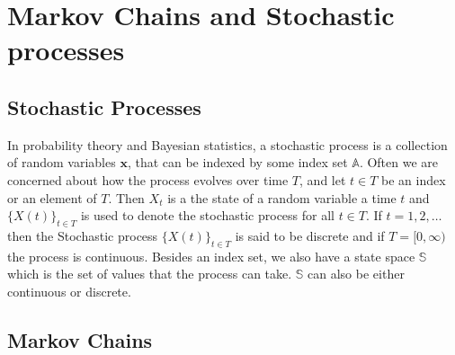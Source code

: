 \chapter{Markov Chains and Stochastic processes}


\section{Stochastic Processes}
In probability theory and Bayesian statistics, a stochastic process is a collection of random variables $\mathbf{x}$, that can be indexed by some index set $\mathbb{A}$. Often we are concerned about how the process evolves over time $T$, and let $t\in T$ be an index or an element of $T$. Then $X_t$ is a the state of a random variable a time $t$ and $\{X(t)\}_{t \in T}$ is used to denote the stochastic process for all $t\in T$. If $t=1,2,\ldots$ then the Stochastic process $\{X(t)\}_{t \in T}$ is said to be discrete and if $T=[0, \infty)$ the process is continuous. Besides an index set, we also have a state space $\mathbb{S}$ which is the set of values that the process can take. $\mathbb{S}$ can also be either continuous or discrete. 

\section{Markov Chains}\label{sec:MarkovChain}




